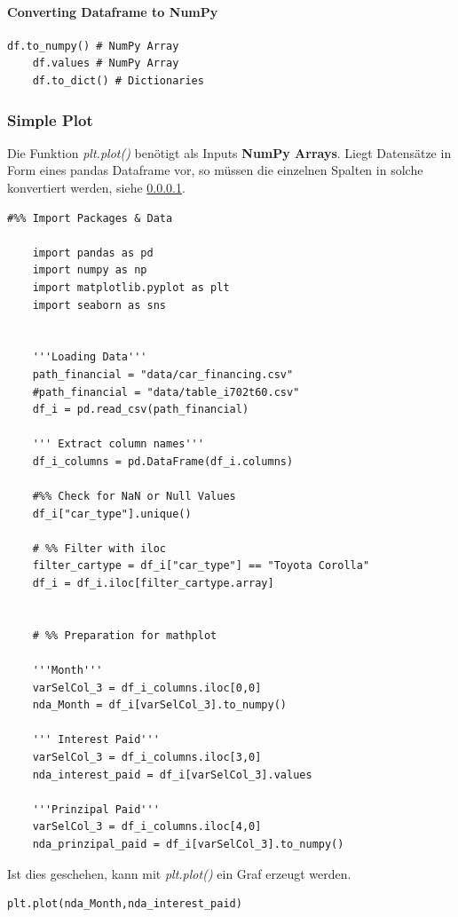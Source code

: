 \paragraph{Converting Dataframe to NumPy}\label{Converting Dataframe to NumP}

\begin{lstlisting}[style=Python]
	df.to_numpy() # NumPy Array
	df.values # NumPy Array
	df.to_dict() # Dictionaries
\end{lstlisting}
\subsubsection{Simple Plot}
Die Funktion \textit{plt.plot()} benötigt als Inputs \textbf{NumPy Arrays}. Liegt Datensätze in Form eines pandas Dataframe vor, so müssen die einzelnen Spalten in solche konvertiert werden, siehe \ref{Converting Dataframe to NumP}.

\begin{lstlisting}[style=Python]
	#%% Import Packages & Data
	
	import pandas as pd
	import numpy as np
	import matplotlib.pyplot as plt 
	import seaborn as sns 
	
	
	'''Loading Data'''
	path_financial = "data/car_financing.csv"
	#path_financial = "data/table_i702t60.csv"
	df_i = pd.read_csv(path_financial)
	
	''' Extract column names'''
	df_i_columns = pd.DataFrame(df_i.columns)
	
	#%% Check for NaN or Null Values
	df_i["car_type"].unique()
	
	# %% Filter with iloc
	filter_cartype = df_i["car_type"] == "Toyota Corolla"
	df_i = df_i.iloc[filter_cartype.array]
	
	
	# %% Preparation for mathplot
	
	'''Month'''
	varSelCol_3 = df_i_columns.iloc[0,0]
	nda_Month = df_i[varSelCol_3].to_numpy()
	
	''' Interest Paid'''
	varSelCol_3 = df_i_columns.iloc[3,0]
	nda_interest_paid = df_i[varSelCol_3].values
	
	'''Prinzipal Paid'''
	varSelCol_3 = df_i_columns.iloc[4,0]
	nda_prinzipal_paid = df_i[varSelCol_3].to_numpy()
\end{lstlisting}
Ist dies geschehen, kann mit \textit{plt.plot()} ein Graf erzeugt werden.

\begin{lstlisting}[style=Python]
	plt.plot(nda_Month,nda_interest_paid)
\end{lstlisting}

